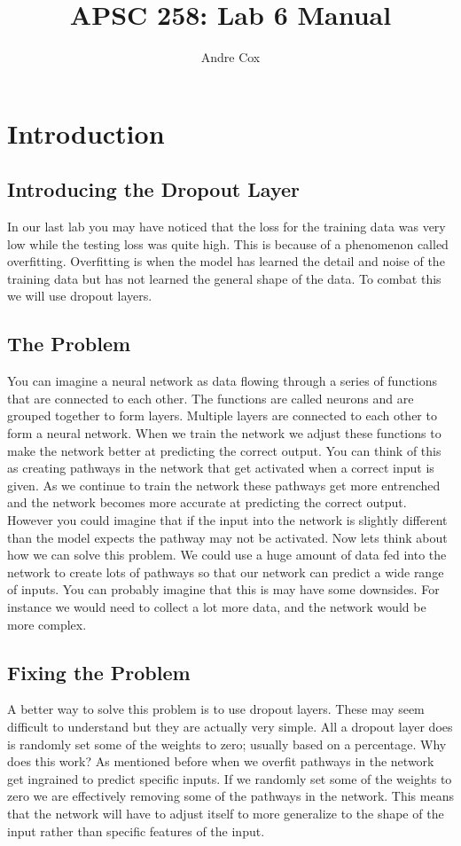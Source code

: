 \documentclass[11pt]{report}
\title{APSC 258: Lab 6 Manual}
\author{Andre Cox}
\begin{document}
\maketitle
\tableofcontents

\clearpage

\chapter{Introduction}
\section{Introducing the Dropout Layer}
In our last lab you may have noticed that the loss for the training data was very low while the testing loss was quite high. This is because of a phenomenon called overfitting. Overfitting is when the model has learned the detail and noise of the training data but has not learned the general shape of the data. To combat this we will use dropout layers. 

\section{The Problem}
You can imagine a neural network as data flowing through a series of functions that are connected to each other. The functions are called neurons and are grouped together to form layers. Multiple layers are connected to each other to form a neural network. When we train the network we adjust these functions to make the network better at predicting the correct output. You can think of this as creating pathways in the network that get activated when a correct input is given. As we continue to train the network these pathways get more entrenched and the network becomes more accurate at predicting the correct output. However you could imagine that if the input into the network is slightly different than the model expects the pathway may not be activated. Now lets think about how we can solve this problem. We could use a huge amount of data fed into the network to create lots of pathways so that our network can predict a wide range of inputs. You can probably imagine that this is may have some downsides. For instance we would need to collect a lot more data, and the network would be more complex. 

\section{Fixing the Problem}
A better way to solve this problem is to use dropout layers. These may seem difficult to understand but they are actually very simple. All a dropout layer does is randomly set some of the weights to zero; usually based on a percentage. Why does this work? As mentioned before when we overfit pathways in the network get ingrained to predict specific inputs. If we randomly set some of the weights to zero we are effectively removing some of the pathways in the network. This means that the network will have to adjust itself to more generalize to the shape of the input rather than specific features of the input.
\end{document}

